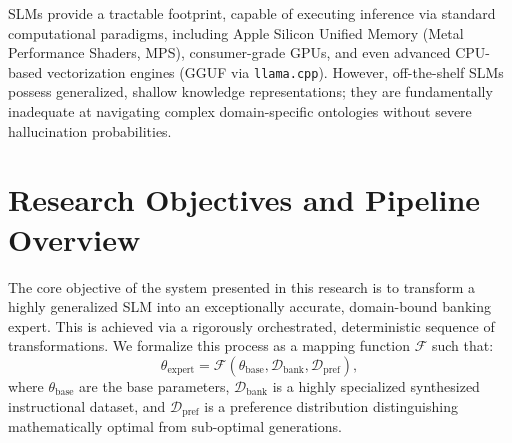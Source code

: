 \documentclass[12pt,a4paper]{report}
\begin{document}
SLMs provide a tractable footprint, capable of executing inference via standard computational paradigms, including Apple Silicon Unified Memory (Metal Performance Shaders, MPS), consumer-grade GPUs, and even advanced CPU-based vectorization engines (GGUF via \texttt{llama.cpp}). However, off-the-shelf SLMs possess generalized, shallow knowledge representations; they are fundamentally inadequate at navigating complex domain-specific ontologies without severe hallucination probabilities.

\section{Research Objectives and Pipeline Overview}

The core objective of the system presented in this research is to transform a highly generalized SLM into an exceptionally accurate, domain-bound banking expert. This is achieved via a rigorously orchestrated, deterministic sequence of transformations. We formalize this process as a mapping function $\mathcal{F}$ such that:
\begin{equation}
    \theta_{\text{expert}} = \mathcal{F}(\theta_{\text{base}}, \mathcal{D}_{\text{bank}}, \mathcal{D}_{\text{pref}}),
\end{equation}
where $\theta_{\text{base}}$ are the base parameters, $\mathcal{D}_{\text{bank}}$ is a highly specialized synthesized instructional dataset, and $\mathcal{D}_{\text{pref}}$ is a preference distribution distinguishing mathematically optimal from sub-optimal generations.
\end{document}
